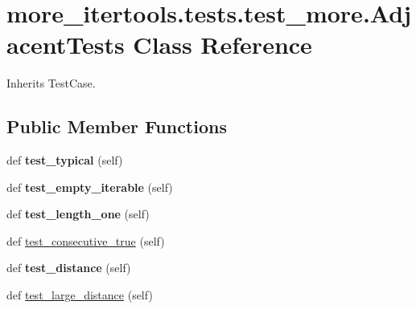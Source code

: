 \hypertarget{classmore__itertools_1_1tests_1_1test__more_1_1_adjacent_tests}{}\section{more\+\_\+itertools.\+tests.\+test\+\_\+more.\+Adjacent\+Tests Class Reference}
\label{classmore__itertools_1_1tests_1_1test__more_1_1_adjacent_tests}


Inherits Test\+Case.

\subsection*{Public Member Functions}
\begin{DoxyCompactItemize}
\item 
\mbox{\label{classmore__itertools_1_1tests_1_1test__more_1_1_adjacent_tests_a02d2d87d0af3f37c6efd601bc161af98}} 
def {\bfseries test\+\_\+typical} (self)
\item 
\mbox{\label{classmore__itertools_1_1tests_1_1test__more_1_1_adjacent_tests_a1d28158b9f069e78e3b56fe5c938559c}} 
def {\bfseries test\+\_\+empty\+\_\+iterable} (self)
\item 
\mbox{\label{classmore__itertools_1_1tests_1_1test__more_1_1_adjacent_tests_a445c1c65b0bf725db1eafc2500d52ee1}} 
def {\bfseries test\+\_\+length\+\_\+one} (self)
\item 
def \hyperlink{classmore__itertools_1_1tests_1_1test__more_1_1_adjacent_tests_a7233cc456ea857a668a4ab85766ca68c}{test\+\_\+consecutive\+\_\+true} (self)
\item 
\mbox{\label{classmore__itertools_1_1tests_1_1test__more_1_1_adjacent_tests_ac8face822be511385c07298396a75993}} 
def {\bfseries test\+\_\+distance} (self)
\item 
def \hyperlink{classmore__itertools_1_1tests_1_1test__more_1_1_adjacent_tests_a54f63805fdf54d04b26bd4a4d4a35838}{test\+\_\+large\+\_\+distance} (self)
\item 

\end{DoxyCompactItemize}
